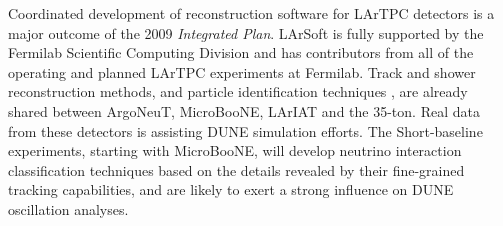 Coordinated development of reconstruction software for LArTPC detectors is a major outcome of the 2009 \textit{Integrated Plan}.  LArSoft is fully supported by the Fermilab Scientific Computing Division and has contributors from all of the operating and planned LArTPC experiments at Fermilab.  Track and shower reconstruction methods, and particle identification techniques , are already shared between ArgoNeuT, MicroBooNE, LArIAT and the 35-ton.  Real data from these detectors is assisting DUNE simulation efforts.  The Short-baseline experiments, starting with MicroBooNE, will develop neutrino interaction classification techniques based on the details revealed by their fine-grained tracking capabilities, and are likely to exert a strong influence on DUNE oscillation analyses.



 